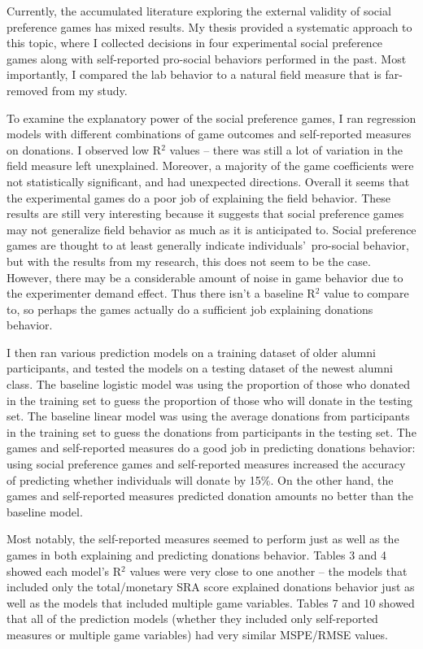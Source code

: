 \documentclass[12pt]{article}
\begin{document}
Currently, the accumulated literature exploring the external validity of social preference games has mixed results. My thesis provided a systematic approach to this topic, where I collected decisions in four experimental social preference games along with self-reported pro-social behaviors performed in the past. Most importantly, I compared the lab behavior to a natural field measure that is far-removed from my study.

To examine the explanatory power of the social preference games, I ran regression models with different combinations of game outcomes and self-reported measures on donations. I observed low R$^{2}$ values -- there was still a lot of variation in the field measure left unexplained. Moreover, a majority of the game coefficients were not statistically significant, and had unexpected directions. Overall it seems that the experimental games do a poor job of explaining the field behavior. These results are still very interesting because it suggests that social preference games may not generalize field behavior as much as it is anticipated to. Social preference games are thought to at least generally indicate individuals\rq \ pro-social behavior, but with the results from my research, this does not seem to be the case. However, there may be a considerable amount of noise in game behavior due to the experimenter demand effect. Thus there isn\rq t a baseline R$^{2}$ value to compare to, so perhaps the games actually do a sufficient job explaining donations behavior.

I then ran various prediction models on a training dataset of older alumni participants, and tested the models on a testing dataset of the newest alumni class. The baseline logistic model was using the proportion of those who donated in the training set to guess the proportion of those who will donate in the testing set. The baseline linear model was using the average donations from participants in the training set to guess the donations from participants in the testing set. The games and self-reported measures do a good job in predicting donations behavior:  using social preference games and self-reported measures increased the accuracy of predicting whether individuals will donate by 15\%. On the other hand, the games and self-reported measures predicted donation amounts no better than the baseline model.

Most notably, the self-reported measures seemed to perform just as well as the games in both explaining and predicting donations behavior. Tables 3 and 4 showed each model\rq s R$^{2}$ values were very close to one another -- the models that included only the total/monetary SRA score explained donations behavior just as well as the models that included multiple game variables. Tables 7 and 10 showed that all of the prediction models (whether they included only self-reported measures or multiple game variables) had very similar MSPE/RMSE values.
\end{document}
